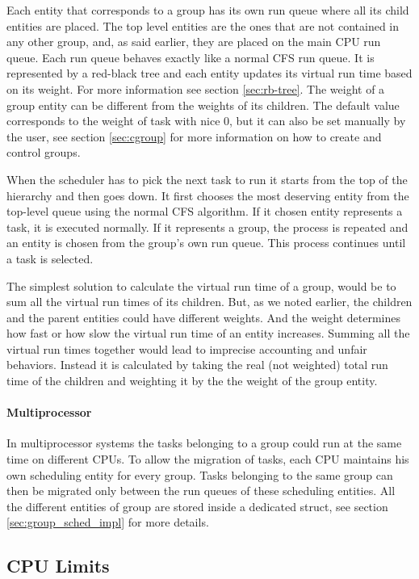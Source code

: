 Each entity that corresponds to a group has its own run queue where all its child entities are placed. The top level entities are the ones that are not contained in any other group, and, as said earlier, they are placed on the main CPU run queue. Each run queue behaves exactly like a normal CFS run queue. It is represented by a red-black tree and each entity updates its virtual run time based on its weight. For more information see section \ref{sec:rb-tree}. The weight of a group entity can be different from the weights of its children. The default value corresponds to the weight of task with nice 0, but it can also be set manually by the user, see section \ref{sec:cgroup} for more information on how to create and control groups.

When the scheduler has to pick the next task to run it starts from the top of the hierarchy and then goes down. It first chooses the most deserving entity from the top-level queue using the normal CFS algorithm. If it chosen entity represents a task, it is executed normally. If it represents a group, the process is repeated and an entity is chosen from the group's own run queue. This process continues until a task is selected.

The simplest solution to calculate the virtual run time of a group, would be to sum all the virtual run times of its children. But, as we noted earlier, the children and the parent entities could have different weights. And the weight determines how fast or how slow the virtual run time of an entity increases. Summing all the virtual run times together would lead to imprecise accounting and unfair behaviors. Instead it is calculated by taking the real (not weighted) total run time of the children and weighting it by the the weight of the group entity.

\paragraph{Multiprocessor}
In multiprocessor systems the tasks belonging to a group could run at the same time on different CPUs. To allow the migration of tasks, each CPU maintains his own scheduling entity for every group. Tasks belonging to the same group can then be migrated only between the run queues of these scheduling entities. All the different entities of group are stored inside a dedicated struct, see section \ref{sec:group_sched_impl} for more details.

\subsection{CPU Limits}%

